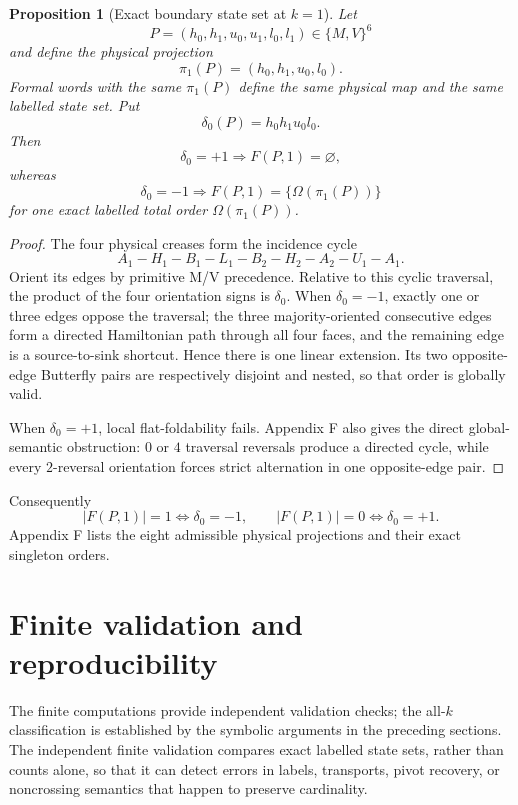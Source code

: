 \documentclass[11pt]{article}
\newtheorem{proposition}[theorem]{Proposition}
\theoremstyle{definition}
\theoremstyle{remark}
\begin{document}
\begin{proposition}[Exact boundary state set at $k=1$]\label{obj:P4}
Let \[
P=(h_0,h_1,u_0,u_1,l_0,l_1)\in\{M,V\}^6
\] and define the physical projection \[
\pi_1(P)=(h_0,h_1,u_0,l_0).
\] Formal words with the same \(\pi_1(P)\) define the same physical map
and the same labelled state set. Put \[
\delta_0(P)=h_0h_1u_0l_0.
\] Then \[
\delta_0=+1\Longrightarrow F(P,1)=\varnothing,
\] whereas \[
\delta_0=-1\Longrightarrow F(P,1)=\{\Omega(\pi_1(P))\}
\] for one exact labelled total order \(\Omega(\pi_1(P))\).
\end{proposition}
\begin{proof}
 The four physical creases form the incidence cycle \[
A_1-H_1-B_1-L_1-B_2-H_2-A_2-U_1-A_1.
\] Orient its edges by primitive M/V precedence. Relative to this cyclic
traversal, the product of the four orientation signs is \(\delta_0\).
When \(\delta_0=-1\), exactly one or three edges oppose the traversal;
the three majority-oriented consecutive edges form a directed
Hamiltonian path through all four faces, and the remaining edge is a
source-to-sink shortcut. Hence there is one linear extension. Its two
opposite-edge Butterfly pairs are respectively disjoint and nested, so
that order is globally valid.

When \(\delta_0=+1\), local flat-foldability fails. Appendix F also
gives the direct global-semantic obstruction: \(0\) or \(4\) traversal
reversals produce a directed cycle, while every \(2\)-reversal
orientation forces strict alternation in one opposite-edge pair.
\end{proof}


Consequently \[
|F(P,1)|=1\iff\delta_0=-1,
\qquad
|F(P,1)|=0\iff\delta_0=+1.
\] Appendix F lists the eight admissible physical projections and their
exact singleton orders.

\section{Finite validation and reproducibility}\label{finite-validation-and-reproducibility-firewall}

The finite computations provide independent validation checks; the all-$k$ classification is established by the symbolic arguments in the preceding sections. The independent finite validation compares exact labelled state sets, rather than counts alone, so that it can detect errors in labels, transports, pivot recovery, or noncrossing semantics that happen to preserve cardinality.
\end{document}
